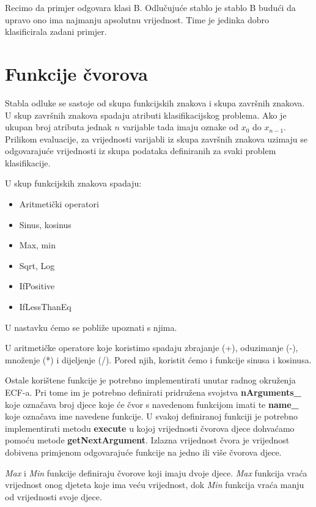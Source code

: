 \documentclass[times, utf8, zavrsni]{fer}
\begin{document}
Recimo da primjer odgovara klasi B. Odlučujuće stablo je stablo B budući da upravo ono ima najmanju apsolutnu vrijednost. Time je jedinka dobro klasificirala zadani primjer.


\section{Funkcije čvorova}

Stabla odluke se sastoje od skupa funkcijskih znakova i skupa završnih znakova. U skup završnih znakova spadaju atributi klasifikacijskog problema. Ako je ukupan broj atributa jednak $n$ varijable tada imaju oznake od $x_0$ do $x_{n-1}$. Prilikom evaluacije, za vrijednosti varijabli iz skupa završnih znakova uzimaju se odgovarajuće vrijednosti iz skupa podataka definiranih za svaki problem klasifikacije.

U skup funkcijskih znakova spadaju:

\begin{itemize}
\item Aritmetički operatori
\item Sinus, kosinus
\item Max, min
\item Sqrt, Log
\item IfPositive
\item IfLessThanEq
\end{itemize}

U nastavku ćemo se pobliže upoznati s njima.

U aritmetičke operatore koje koristimo spadaju zbrajanje (+), oduzimanje (-), množenje (*) i dijeljenje (/). Pored njih, koristit ćemo i funkcije sinusa i kosinusa. 

Ostale korištene funkcije je potrebno implementirati unutar radnog okruženja ECF-a. Pri tome im je potrebno definirati pridružena svojstva \textbf{nArguments\_} koje označava broj djece koje će čvor s navedenom funkcijom imati te \textbf{name\_} koje označava ime navedene funkcije. U svakoj definiranoj funkciji je potrebno implementirati metodu \textbf{execute} u kojoj vrijednosti čvorova djece dohvaćamo pomoću metode \textbf{getNextArgument}. Izlazna vrijednost čvora je vrijednost dobivena primjenom odgovarajuće funkcije na jedno ili više čvorova djece.


\textit{Max} i \textit{Min} funkcije definiraju čvorove koji imaju dvoje djece. \textit{Max} funkcija vraća vrijednost onog djeteta koje ima veću vrijednost, dok \textit{Min} funkcija vraća manju od vrijednosti svoje djece.
\end{document}
